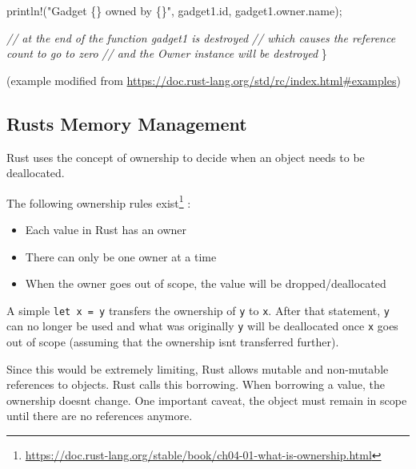 \documentclass[
]{article}
\newenvironment{Shaded}{}{}
\newcommand{\CommentTok}[1]{\textcolor[rgb]{0.38,0.63,0.69}{\textit{#1}}}
\newcommand{\NormalTok}[1]{#1}
\newcommand{\OperatorTok}[1]{\textcolor[rgb]{0.40,0.40,0.40}{#1}}
\newcommand{\PreprocessorTok}[1]{\textcolor[rgb]{0.74,0.48,0.00}{#1}}
\newcommand{\StringTok}[1]{\textcolor[rgb]{0.25,0.44,0.63}{#1}}
\begin{document}
\begin{Shaded}
\begin{Highlighting}[]
    \PreprocessorTok{println!}\NormalTok{(}\StringTok{"Gadget \{\} owned by \{\}"}\OperatorTok{,}\NormalTok{ gadget1}\OperatorTok{.}\NormalTok{id}\OperatorTok{,}\NormalTok{ gadget1}\OperatorTok{.}\NormalTok{owner}\OperatorTok{.}\NormalTok{name)}\OperatorTok{;}

    \CommentTok{// at the end of the function gadget1 is destroyed}
    \CommentTok{// which causes the reference count to go to zero}
    \CommentTok{// and the Owner instance will be destroyed}
\OperatorTok{\}}
\end{Highlighting}
\end{Shaded}

(example modified from
\url{https://doc.rust-lang.org/std/rc/index.html\#examples})

\subsection{Rust\textquotesingle s Memory
Management}\label{rusts-memory-management}

Rust uses the concept of ownership to decide when an object needs to be
deallocated.

The following ownership rules exist\footnote{\url{https://doc.rust-lang.org/stable/book/ch04-01-what-is-ownership.html}}
:

\begin{itemize}
\item
  Each value in Rust has an owner
\item
  There can only be one owner at a time
\item
  When the owner goes out of scope, the value will be
  dropped/deallocated
\end{itemize}

A simple \texttt{let\ x\ =\ y} transfers the ownership of \texttt{y} to
\texttt{x}. After that statement, \texttt{y} can no longer be used and
what was originally \texttt{y} will be deallocated once \texttt{x} goes
out of scope (assuming that the ownership isn\textquotesingle t
transferred further).

Since this would be extremely limiting, Rust allows mutable and
non-mutable references to objects. Rust calls this borrowing. When
borrowing a value, the ownership doesn\textquotesingle t change. One
important caveat, the object must remain in scope until there are no
references anymore.
\end{document}
